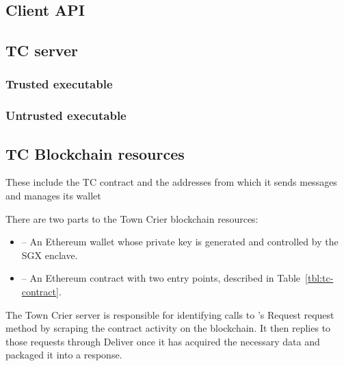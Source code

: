 \subsection{Client API}
\subsection{TC server}
\subsubsection{Trusted executable}
\subsubsection{Untrusted executable}
\subsection{TC Blockchain resources}
These include the TC contract and the addresses from which it sends messages and manages its wallet

There are two parts to the Town Crier blockchain resources:
\begin{itemize}
  \item \sgxadd -- An Ethereum wallet whose private key is generated and controlled by the SGX enclave.
  
  \item \tcont -- An Ethereum contract with two entry points, described in Table~\ref{tbl:tc-contract}.
\end{itemize}
The Town Crier server is responsible for identifying calls to \tcont's Request request method by scraping the contract activity on the blockchain.
It then replies to those requests through Deliver once it has acquired the necessary data and packaged it into a response.

